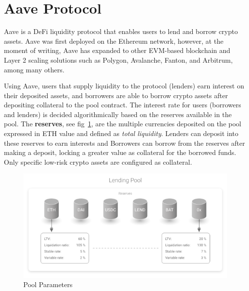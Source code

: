 \documentclass[11pt,a4paper]{report}
\begin{document}
\section{Aave Protocol}\label{sec:aave}
Aave\cite{aaveV1}\cite{aaveV2}\cite{aaveV3} is a DeFi liquidity protocol that enables users to lend and borrow crypto assets. Aave was first deployed on the Ethereum network, however, at the moment of writing, Aave has expanded to other EVM-based blockchain and Layer 2 scaling solutions such as  Polygon\cite{polygon}, Avalanche\cite{avax}, Fanton\cite{fanton}, and Arbitrum\cite{arbitrum}, among many others.

Using Aave, users that supply liquidity to the protocol (lenders) earn interest on their deposited assets, and borrowers are able to borrow crypto assets after depositing collateral to the pool contract. The interest rate for users (borrowers and lenders) is decided algorithmically based on the reserves available in the pool. The \textbf{reserves}, see fig~\ref{fig:pool}, are the multiple currencies deposited on the pool expressed in ETH value and defined as \textit{total liquidity}. Lenders can deposit into these reserves to earn interests and Borrowers can borrow from the reserves after making a deposit, locking a greater value as collateral for the borrowed funds. Only specific low-risk crypto assets are configured as collateral.\label{reserve}  
\begin{figure}[htp]
	\centering
	\includegraphics[width=0.99\textwidth]{./images/lp_reserves}
	\caption{Pool Parameters\cite{aaveV1}}
	\label{fig:pool}
\end{figure}
\end{document}
